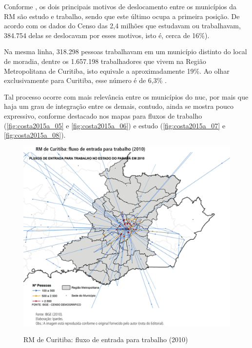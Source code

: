 	Conforme , os dois principais motivos de deslocamento entre os municípios da RM são estudo e trabalho, sendo que este último ocupa a primeira posição. De acordo com os dados do Censo das 2,4 milhões que estudavam ou trabalhavam, 384.754 delas se deslocavam por esses motivos, isto é, cerca de 16\%).
	
	Na mesma linha, 318.298 pessoas trabalhavam em um município distinto do local de moradia, dentre os 1.657.198 trabalhadores que vivem na Região Metropolitana de Curitiba, isto equivale a aproximadamente 19\%. Ao olhar exclusivamente para Curitiba, esse número é de 6,3\% .
	
	Tal processo ocorre com mais relevância entre os municípios do \gls{nuc}, por mais que haja um grau de integração entre os demais, contudo, ainda se mostra pouco expressivo, conforme destacado nos mapas para fluxos de trabalho (\autoref{fig:costa2015a_05} e \autoref{fig:costa2015a_06}) e estudo (\autoref{fig:costa2015a_07} e \autoref{fig:costa2015a_08}).
	
	\begin{figure}
		\centering
		\caption{RM de Curitiba: fluxo de entrada para trabalho (2010)}
		\includegraphics[width=1.0\linewidth]{img/costa2015a_05}
		\label{fig:costa2015a_05}
	\end{figure}

